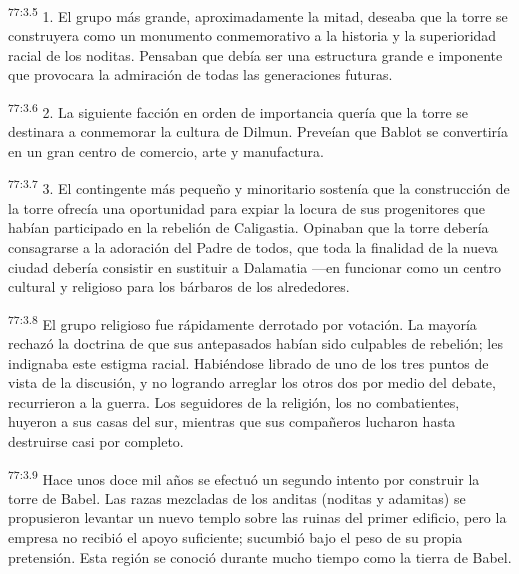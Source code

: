 \par
\textsuperscript{77:3.5} 1. El grupo más grande, aproximadamente la mitad, deseaba que la torre se construyera como un monumento conmemorativo a la historia y la superioridad racial de los noditas. Pensaban que debía ser una estructura grande e imponente que provocara la admiración de todas las generaciones futuras.

\par
\textsuperscript{77:3.6} 2. La siguiente facción en orden de importancia quería que la torre se destinara a conmemorar la cultura de Dilmun. Preveían que Bablot se convertiría en un gran centro de comercio, arte y manufactura.

\par
\textsuperscript{77:3.7} 3. El contingente más pequeño y minoritario sostenía que la construcción de la torre ofrecía una oportunidad para expiar la locura de sus progenitores que habían participado en la rebelión de Caligastia. Opinaban que la torre debería consagrarse a la adoración del Padre de todos, que toda la finalidad de la nueva ciudad debería consistir en sustituir a Dalamatia ---en funcionar como un centro cultural y religioso para los bárbaros de los alrededores.

\par
\textsuperscript{77:3.8} El grupo religioso fue rápidamente derrotado por votación. La mayoría rechazó la doctrina de que sus antepasados habían sido culpables de rebelión; les indignaba este estigma racial. Habiéndose librado de uno de los tres puntos de vista de la discusión, y no logrando arreglar los otros dos por medio del debate, recurrieron a la guerra. Los seguidores de la religión, los no combatientes, huyeron a sus casas del sur, mientras que sus compañeros lucharon hasta destruirse casi por completo.

\par
\textsuperscript{77:3.9} Hace unos doce mil años se efectuó un segundo intento por construir la torre de Babel. Las razas mezcladas de los anditas (noditas y adamitas) se propusieron levantar un nuevo templo sobre las ruinas del primer edificio, pero la empresa no recibió el apoyo suficiente; sucumbió bajo el peso de su propia pretensión. Esta región se conoció durante mucho tiempo como la tierra de Babel.

